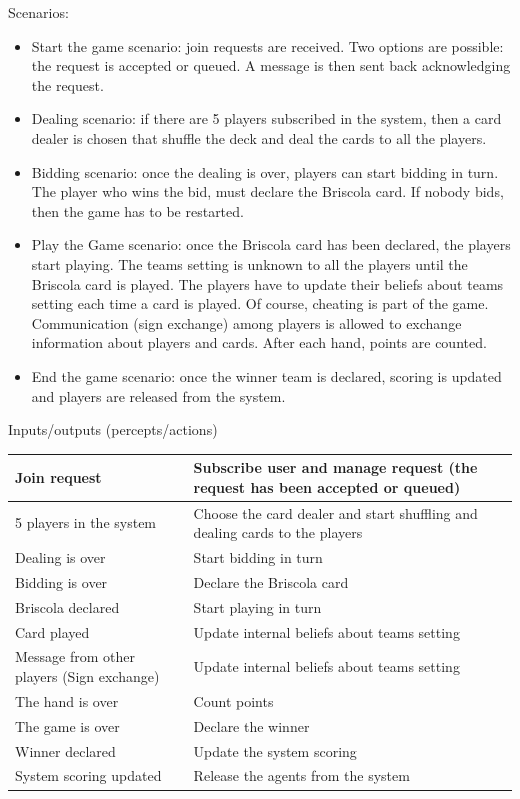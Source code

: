 \documentclass[a4paper]{article}
\begin{document}
Scenarios:
\begin{itemize}
  \item Start the game scenario: join requests are received. Two options are possible: the request is accepted or queued. A message is then sent back acknowledging the request.
  \item Dealing scenario: if there are 5 players subscribed in the system, then a card dealer is chosen that shuffle the deck and deal the cards to all the players.
  \item Bidding scenario: once the dealing is over, players can start bidding in turn. The player who wins the bid, must declare the Briscola card. If nobody bids, then the game has to be restarted.
  \item Play the Game scenario: once the Briscola card has been declared, the players start playing. The teams setting is unknown to all the players until the Briscola card is played. The players have to update their beliefs about teams setting each time a card is played. Of course, cheating is part of the game. Communication (sign exchange) among players is allowed to exchange information about players and cards. After each hand, points are counted.
  \item End the game scenario: once the winner team is declared, scoring is updated and players are released from the system.
\end{itemize}

Inputs/outputs (percepts/actions)
\begin{table}[htp]
  \begin{tabular}{|l|l|}	
    Join request	& Subscribe user and manage request (the request has been accepted or queued) \\
    \hline
    5 players in the system	& Choose the card dealer and start shuffling and dealing cards to the players \\
    \hline
    Dealing is over	& Start bidding in turn \\
    \hline
    Bidding is over	& Declare the Briscola card \\ 
    \hline
    Briscola declared	& Start playing in turn \\
    \hline
    Card played	& Update internal beliefs about teams setting \\
    \hline
    Message from other players (Sign exchange)	& Update internal beliefs about teams setting \\
    \hline
    The hand is over	& Count points \\
    \hline
    The game is over	& Declare the winner \\
    \hline
    Winner declared	 & Update the system scoring \\
    \hline
    System scoring updated	& Release the agents from the system \\
    \hline
  \end{tabular}
\end{table}
\end{document}

